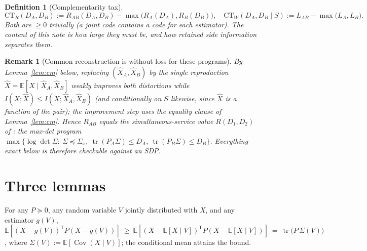 \documentclass[11pt]{article}
\newtheorem{remark}{Remark}\newtheorem{definition}{Definition}
\newcommand{\E}{\mathbb{E}}\newcommand{\tr}{\operatorname{tr}}
\newcommand{\Cov}{\operatorname{Cov}}\newcommand{\Var}{\operatorname{Var}}
\newcommand{\hX}{\widehat X}\newcommand{\hY}{\widehat Y}
\begin{document}
\begin{definition}[Complementarity tax]\label{def:tax}
\[
\mathrm{CT}_R(D_A,D_B):=R_{AB}(D_A,D_B)-\max\bigl(R_A(D_A),R_B(D_B)\bigr),
\quad
\mathrm{CT}_W(D_A,D_B\mid S):=L_{AB}-\max\bigl(L_A,L_B\bigr).
\]
Both are $\ge0$ trivially (a joint code contains a code for each estimator).
The content of this note is \emph{how large} they must be, and how retained
side information separates them.
\end{definition}

\begin{remark}[Common reconstruction is without loss for these programs]
\label{rem:common}
By Lemma~\ref{lem:cm} below, replacing $(\hX_A,\hX_B)$ by the single
reproduction $\hX=\E[X\mid\hX_A,\hX_B]$ weakly improves both distortions
while $I(X;\hX)\le I(X;\hX_A,\hX_B)$ (and conditionally on $S$ likewise,
since $\hX$ is a function of the pair); the improvement step uses the
equality clause of Lemma~\ref{lem:cm}. Hence $R_{AB}$ equals the
simultaneous-service value $R(D_1,D_2)$ of
\cite[\emph{Simultaneous service}, \S7]{bondtwoobserver}: the max-det
program
$\max\{\log\det\Sigma:\ \Sigma\preceq\Sigma_x,\ \tr(P_A\Sigma)\le D_A,\
\tr(P_B\Sigma)\le D_B\}$. Everything exact below is therefore checkable
against an SDP.
\end{remark}

\section{Three lemmas}
\begin{lemma}\label{lem:cm}
For any $P\succeq0$, any random variable $V$ jointly distributed with $X$,
and any estimator $g(V)$,
$\E[(X-g(V))^{\mathsf T}P(X-g(V))]\ \ge\
\E[(X-\E[X\mid V])^{\mathsf T}P(X-\E[X\mid V])]\ =\
\tr\bigl(P\,\Sigma(V)\bigr)$, where
$\Sigma(V):=\E[\Cov(X\mid V)]$; the conditional mean attains the bound.
\end{lemma}
\end{document}
